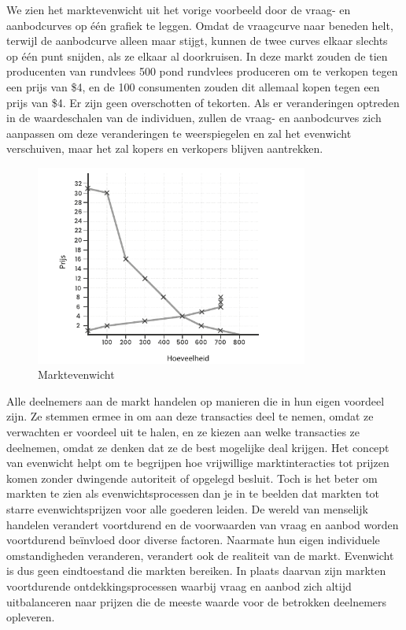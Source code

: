 We zien het marktevenwicht uit het vorige voorbeeld door de vraag- en aanbodcurves op één grafiek te leggen. Omdat de vraagcurve naar beneden helt, terwijl de aanbodcurve alleen maar stijgt, kunnen de twee curves elkaar slechts op één punt snijden, als ze elkaar al doorkruisen. In deze markt zouden de tien producenten van rundvlees 500 pond rundvlees produceren om te verkopen tegen een prijs van \$4, en de 100 consumenten zouden dit allemaal kopen tegen een prijs van \$4. Er zijn geen overschotten of tekorten. Als er veranderingen optreden in de waardeschalen van de individuen, zullen de vraag- en aanbodcurves zich aanpassen om deze veranderingen te weerspiegelen en zal het evenwicht verschuiven, maar het zal kopers en verkopers blijven aantrekken.

\begin{figure}
\centering
    \includegraphics[width=0.8\textwidth]{figures/fig26.pdf}
    \caption[Marktevenwicht]{Marktevenwicht}
    \label{fig26}
\end{figure}

Alle deelnemers aan de markt handelen op manieren die in hun eigen voordeel zijn. Ze stemmen ermee in om aan deze transacties deel te nemen, omdat ze verwachten er voordeel uit te halen, en ze kiezen aan welke transacties ze deelnemen, omdat ze denken dat ze de best mogelijke deal krijgen. Het concept van evenwicht helpt om te begrijpen hoe vrijwillige marktinteracties tot prijzen komen zonder dwingende autoriteit of opgelegd besluit. Toch is het beter om markten te zien als evenwichtsprocessen dan je in te beelden dat markten tot starre evenwichtsprijzen voor alle goederen leiden. De wereld van menselijk handelen verandert voortdurend en de voorwaarden van vraag en aanbod worden voortdurend beïnvloed door diverse factoren. Naarmate hun eigen individuele omstandigheden veranderen, verandert ook de realiteit van de markt. Evenwicht is dus geen eindtoestand die markten bereiken. In plaats daarvan zijn markten voortdurende ontdekkingsprocessen waarbij vraag en aanbod zich altijd uitbalanceren naar prijzen die de meeste waarde voor de betrokken deelnemers opleveren.

